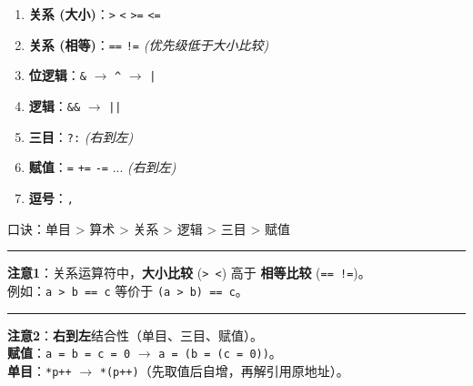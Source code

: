 \documentclass[a4paper,12pt]{article}
\begin{document}
\begin{itemize}
\begin{enumerate}
        \item \textbf{关系 (大小)}：\texttt{>} \texttt{<} \texttt{>=} \texttt{<=}
        \item \textbf{关系 (相等)}：\texttt{==} \texttt{!=} \hfill \textit{(优先级低于大小比较)}
        \item \textbf{位逻辑}：\texttt{\&} $\rightarrow$ \texttt{\^} $\rightarrow$ \texttt{|}
        \item \textbf{逻辑}：\texttt{\&\&} $\rightarrow$ \texttt{||}
        \item \textbf{三目}：\texttt{?:} \hfill \textit{(右到左)}
        \item \textbf{赋值}：\texttt{=} \texttt{+=} \texttt{-=} ... \hfill \textit{(右到左)}
        \item \textbf{逗号}：\texttt{,}
    \end{enumerate}
    \begin{tipbox}[title=优先级口诀与陷阱]
        口诀：单目 > 算术 > 关系 > 逻辑 > 三目 > 赋值
        \par\smallskip\hrule\smallskip\par
        \textbf{注意1}：关系运算符中，\textbf{大小比较} (\texttt{> <}) 高于 \textbf{相等比较} (\texttt{== !=})。
        \\ 例如：\texttt{a > b == c} 等价于 \texttt{(a > b) == c}。
        \par\smallskip\hrule\smallskip\par
        \textbf{注意2}：\textbf{右到左}结合性（单目、三目、赋值）。
        \\ \textbf{赋值}：\texttt{a = b = c = 0} $\rightarrow$ \texttt{a = (b = (c = 0))}。
        \\ \textbf{单目}：\texttt{*p++} $\rightarrow$ \texttt{*(p++)}（先取值后自增，再解引用原地址）。
    \end{tipbox}
\end{itemize}
\end{document}
